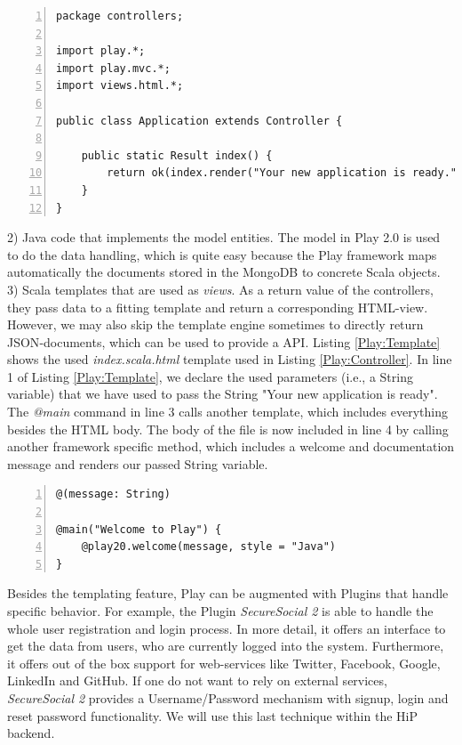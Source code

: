 \begin{lstlisting}[numbers=left,caption={Simple Java-controller within the Play Framework},label=Play:Controller,frame=tlbr,breaklines]
package controllers;

import play.*;
import play.mvc.*;
import views.html.*;

public class Application extends Controller {

    public static Result index() {
        return ok(index.render("Your new application is ready."));
    }
}
\end{lstlisting}

2) Java code that implements the model entities. The model in Play 2.0 is used to do the data handling, which is quite easy because the Play framework maps automatically the documents stored in the MongoDB to concrete Scala objects. \\
3) Scala templates that are used as \textit{views}. As a return value of the controllers, they pass data to a fitting template and return a corresponding \ac{HTML}-view. However, we may also skip the template engine sometimes to directly return \ac{JSON}-documents, which can be used to provide a \ac{API}. Listing \ref{Play:Template} shows the used \textit{index.scala.html} template used in Listing \ref{Play:Controller}. In line 1 of Listing \ref{Play:Template}, we declare the used parameters (i.e., a String variable) that we have used to pass the String "Your new application is ready". The \textit{@main} command in line 3 calls another template, which includes everything besides the \ac{HTML} body. The body of the file is now included in line 4 by calling another framework specific method, which includes a welcome and documentation message and renders our passed String variable.

\begin{lstlisting}[numbers=left,caption={Simple Scala template within the Play Framework},label=Play:Template,frame=tlbr,breaklines]
@(message: String)

@main("Welcome to Play") {
    @play20.welcome(message, style = "Java")
}
\end{lstlisting}

Besides the templating feature, Play can be augmented with Plugins that handle specific behavior. For example, the Plugin \emph{SecureSocial 2} is able to handle the whole user registration and login process. In more detail, it offers an interface to get the data from users, who are currently logged into the system. Furthermore, it offers out of the box support for web-services like Twitter, Facebook, Google, LinkedIn and GitHub. If one do not want to rely on external services, \emph{SecureSocial 2} provides a Username/Password mechanism with signup, login and reset password functionality. We will use this last technique within the \ac{HiP} backend.


